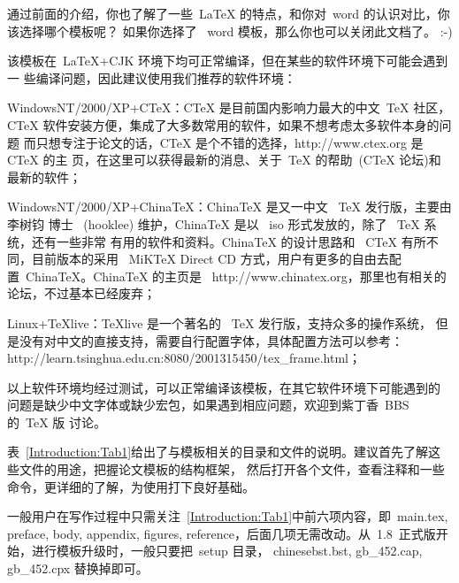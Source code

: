 通过前面的介绍，你也了解了一些~LaTeX 的特点，和你对~word 的认识对比，你该选择哪个模板呢？
如果你选择了 ~word 模板，那么你也可以关闭此文档了。 :-)

该模板在~\LaTeX{}+CJK 环境下均可正常编译，但在某些的软件环境下可能会遇到一
些编译问题，因此建议使用我们推荐的软件环境：
\begin{hitlist}
\item WindowsNT/2000/XP+CTeX：CTeX 是目前国内影响力最大的中文~TeX 社区，CTeX
软件安装方便，集成了大多数常用的软件，如果不想考虑太多软件本身的问题
而只想专注于论文的话，CTeX 是个不错的选择，http://www.ctex.org 是~ CTeX 的主
页，在这里可以获得最新的消息、关于~TeX 的帮助~(CTeX
论坛)和最新的软件；
\item WindowsNT/2000/XP+ChinaTeX：ChinaTeX 是又一中文~ TeX 发行版，主要由李树钧
博士~ (hooklee) 维护，ChinaTeX 是以~ iso 形式发放的，除了~ TeX 系统，还有一些非常
有用的软件和资料。ChinaTeX 的设计思路和~ CTeX 有所不同，目前版本的采用~ MiKTeX
Direct CD 方式，用户有更多的自由去配置~ChinaTeX。ChinaTeX 的主页是~
http://www.chinatex.org，那里也有相关的论坛，不过基本已经废弃；
\item Linux+TeXlive：TeXlive 是一个著名的~ TeX 发行版，支持众多的操作系统，
但是没有对中文的直接支持，需要自行配置字体，具体配置方法可以参考：
http://learn.tsinghua.edu.cn:8080/2001315450/tex\_frame.html；
\end{hitlist}

以上软件环境均经过测试，可以正常编译该模板，在其它软件环境下可能遇到的
问题是缺少中文字体或缺少宏包，如果遇到相应问题，欢迎到紫丁香~BBS 的~TeX 版
讨论。


表~\ref{Introduction:Tab1}给出了与模板相关的目录和文件的说明。建议首先了解这些文件的用途，把握论文模板的结构框架，
然后打开各个文件，查看注释和一些命令，更详细的了解，为使用打下良好基础。

一般用户在写作过程中只需关注~\ref{Introduction:Tab1}中前六项内容，即~main.tex, preface, body, appendix,
figures, reference，后面几项无需改动。从~1.8~正式版开始，进行模板升级时，一般只要把~setup 目录，
chinesebst.bst, gb\_452.cap, gb\_452.cpx 替换掉即可。

